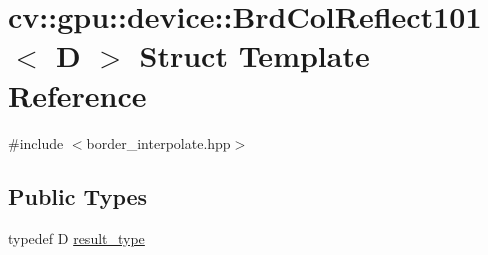 \hypertarget{structcv_1_1gpu_1_1device_1_1BrdColReflect101}{\section{cv\-:\-:gpu\-:\-:device\-:\-:Brd\-Col\-Reflect101$<$ D $>$ Struct Template Reference}
\label{structcv_1_1gpu_1_1device_1_1BrdColReflect101}
}


{\ttfamily \#include $<$border\-\_\-interpolate.\-hpp$>$}

\subsection*{Public Types}
\begin{DoxyCompactItemize}
\item 
typedef D \hyperlink{structcv_1_1gpu_1_1device_1_1BrdColReflect101_a025ccbde06463c89254318cbb6942d80}{result\-\_\-type}
\end{DoxyCompactItemize}
